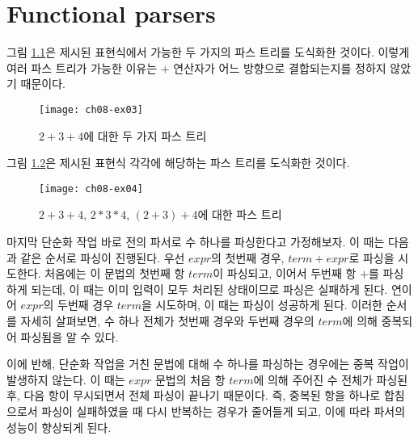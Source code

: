 \chapter{\Large{Functional parsers}}



그림 \ref{fig:ex83}은 제시된 표현식에서 가능한 두 가지의 파스 트리를 도식화한
것이다. 이렇게 여러 파스 트리가 가능한 이유는 $+$ 연산자가 어느 방향으로
결합되는지를 정하지 않았기 때문이다.
\begin{figure}[t]
  \centering
  \texttt{[image: ch08-ex03]}
  \caption{$2+3+4$에 대한 두 가지 파스 트리}
  \label{fig:ex83}
\end{figure}

그림 \ref{fig:ex84}은 제시된 표현식 각각에 해당하는 파스 트리를 도식화한 것이다.
\begin{figure}[t]
  \centering
  \texttt{[image: ch08-ex04]}
  \caption{$2+3+4$, $2 * 3 * 4$, $(2+3)+4$에 대한 파스 트리}
  \label{fig:ex84}
\end{figure}

마지막 단순화 작업 바로 전의 파서로 수 하나를 파싱한다고 가정해보자. 이 때는
다음과 같은 순서로 파싱이 진행된다. 우선 $expr$의 첫번째 경우, $term+expr$로
파싱을 시도한다. 처음에는 이 문법의 첫번째 항 $term$이 파싱되고, 이어서 두번째
항 $+$를 파싱하게 되는데, 이 때는 이미 입력이 모두 처리된 상태이므로 파싱은
실패하게 된다. 연이어 $expr$의 두번째 경우 $term$을 시도하며, 이 때는 파싱이
성공하게 된다. 이러한 순서를 자세히 살펴보면, 수 하나 전체가 첫번째 경우와
두번째 경우의 $term$에 의해 중복되어 파싱됨을 알 수 있다.

이에 반해, 단순화 작업을 거친 문법에 대해 수 하나를 파싱하는 경우에는 중복
작업이 발생하지 않는다. 이 때는 $expr$ 문법의 처음 항 $term$에 의해
주어진 수 전체가 파싱된 후, 다음 항이 무시되면서 전체 파싱이 끝나기
때문이다. 즉, 중복된 항을 하나로 합침으로서 파싱이 실패하였을 때 다시 반복하는
경우가 줄어들게 되고, 이에 따라 파서의 성능이 향상되게 된다.

